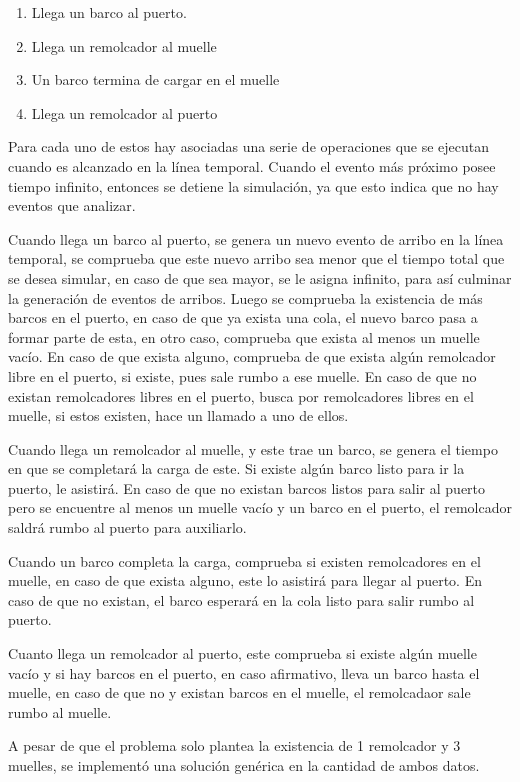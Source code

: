 \documentclass[titlepage,11pt]{scrartcl}
\begin{document}
	\begin{enumerate}
		\item Llega un barco al puerto.
		\item Llega un remolcador al muelle
		\item Un barco termina de cargar en el muelle
		\item Llega un remolcador al puerto
	\end{enumerate}

	Para cada uno de estos hay asociadas una serie de operaciones que se ejecutan cuando es alcanzado en la línea temporal. Cuando el evento más próximo posee tiempo infinito, entonces se detiene la simulación, ya que esto indica que no hay eventos que analizar. 
	
	Cuando llega un barco al puerto, se genera un nuevo evento de arribo en la línea temporal, se comprueba que este nuevo arribo sea menor que el tiempo total que se desea simular, en caso de que sea mayor, se le asigna infinito, para así culminar la generación de eventos de arribos. Luego se comprueba la existencia de más barcos en el puerto, en caso de que ya exista una cola, el nuevo barco pasa a formar parte de esta, en otro caso, comprueba que exista al menos un muelle vacío. En caso de que exista alguno, comprueba de que exista algún remolcador libre en el puerto, si existe, pues sale rumbo a ese muelle. En caso de que no existan remolcadores libres en el puerto, busca por remolcadores libres en el muelle, si estos existen, hace un llamado a uno de ellos.

	Cuando llega un remolcador al muelle, y este trae un barco, se genera el tiempo en que se completará la carga de este. Si existe algún barco listo para ir la puerto, le asistirá. En caso de que no existan barcos listos para salir al puerto pero se encuentre al menos un muelle vacío y un barco en el puerto, el remolcador saldrá rumbo al puerto para auxiliarlo.

	Cuando un barco completa la carga, comprueba si existen remolcadores en el muelle, en caso de que exista alguno, este lo asistirá para llegar al puerto. En caso de que no existan, el barco esperará en la cola listo para salir rumbo al puerto.

	Cuanto llega un remolcador al puerto, este comprueba si existe algún muelle vacío y si hay barcos en el puerto, en caso afirmativo, lleva un barco hasta el muelle, en caso de que no y existan barcos en el muelle, el remolcadaor sale rumbo al muelle.

	A pesar de que el problema solo plantea la existencia de 1 remolcador y 3 muelles, se implementó una solución genérica en la cantidad de ambos datos.
\end{document}
